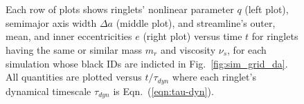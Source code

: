 \documentclass[preprint]{aastex62}
\begin{document}
\begin{figure}
    \vspace{5ex}\ \\
\end{figure}
\begin{figure}
    \vspace{5ex}\ \\
\end{figure}
\begin{figure}
    \caption{
        \label{fig:low_libration_sims}
        Each row of plots shows
        ringlets' nonlinear parameter $q$ (left plot), semimajor axis width
        $\Delta a$ (middle plot), and streamline's outer, mean, and inner eccentricities $e$ (right plot)
        versus time $t$
        for ringlets having the same or similar mass $m_r$ and viscosity $\nu_s$, for each
        simulation whose black IDs are indicted in Fig.\ \ref{fig:sim_grid_da}. All quantities are plotted 
        versus $t/\tau_{dyn}$ where each ringlet's dynamical timescale $\tau_{dyn}$
        is Eqn.\ (\ref{eqn:tau-dyn}).
    }
\end{figure}
\end{document}
